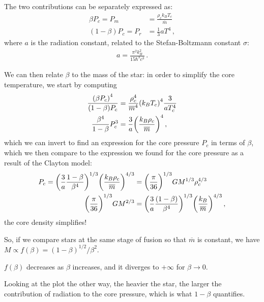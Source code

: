 \documentclass[main.tex]{subfiles}
\begin{document}
The two contributions can be separately expressed as:
%
\begin{align}
  \beta P_c = P_m &= \frac{\rho _c k_B T_c}{\overline{m}} \\
  (1 - \beta ) P_c = P_r &= \frac{1}{3} a T^4
\,,
\end{align}
%
where \(a\) is the radiation constant, related to the Stefan-Boltzmann constant \(\sigma \):
%
\begin{align}
  a = \frac{\pi^2   k_B^2}{15 \hbar^3 c^3}
\,.
\end{align}

We can then relate \(\beta \) to the mass of the star: in order to simplify the core temperature, we start by computing
%
\begin{align}
  \frac{\qty(\beta P_c )^{4}}{(1 - \beta ) P_c} &= \frac{\rho _c^{4}}{\overline{m}^{4}} \qty(k_B T_c)^{4} \frac{3}{a T_c^{4}}  \\
  \frac{\beta^{4}}{1 -\beta } P_c^3 &= \frac{3}{a} \qty(\frac{k_B \rho _c}{\overline{m}})^{4}
\,,
\end{align}
%
which we can invert to find an expression for the core pressure \(P_c \) in terms of \(\beta \), which we then compare to the expression we found for the core pressure as a result of the Clayton model: 
%
\begin{align}
  P_c = \qty(\frac{3}{a} \frac{1 - \beta  }{\beta^{4}})^{1/3} \qty(\frac{k_B \rho _c }{\overline{m}})^{4/3}
  &= \qty(\frac{\pi }{36})^{1/3} G M^{1/3} \rho _c^{4/3} \\
  \qty(\frac{\pi }{36})^{1/3} G M^{2/3} 
  &= \qty(\frac{3}{a} \frac{(1-\beta )}{\beta^{4}})^{1/3}
  \qty(\frac{k_B}{\overline{m}})^{4/3}
\,,
\end{align}
%
the core density simplifies! 

So, if we compare stars at the same stage of fusion so that \(\overline{m}\) is constant, we have \(M \propto f(\beta ) = (1 - \beta )^{1/2} / \beta^2\).  

\(f(\beta )\) decreases as \(\beta \) increases, and it diverges to \(+ \infty \) for \(\beta \to 0\). 

Looking at the plot the other way, the heavier the star, the larger the contribution of radiation to the core pressure, which is what \(1-\beta \) quantifies.
\end{document}

